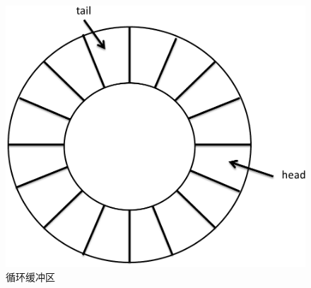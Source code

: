 \documentclass[b5paper]{ctexart}
\begin{document}
\begin{figure}[htbp]
 \centering
 \includegraphics[scale=0.3]{img/ring-buffer}
 \caption{循环缓冲区}
 \label{fig:circular-buffer}
\end{figure}
\end{document}
